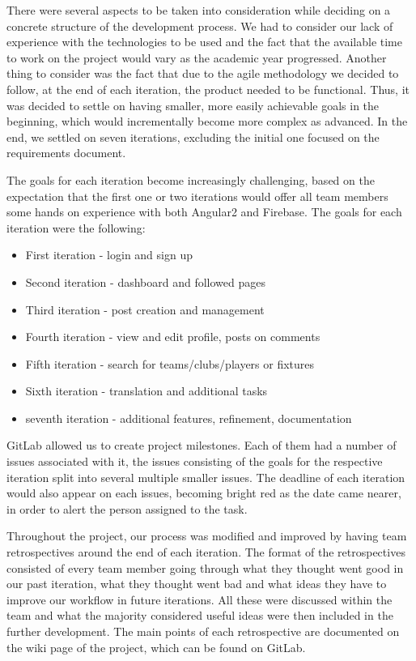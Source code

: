 \documentclass{l3proj}
\begin{document}
There were several aspects to be taken into consideration while deciding
 on a concrete structure of the development process. We had to consider
 our lack of experience with the technologies to be used and the fact
 that the available time to work on the project would vary as the academic
 year progressed. Another thing to consider was the fact that due to the
 agile methodology we decided to follow, at the end of each iteration, the
 product needed to be functional. Thus, it was decided to settle on having
 smaller, more easily achievable goals in the beginning, which would
 incrementally become more complex as advanced. In the end, we settled
 on seven iterations, excluding the initial one focused on the requirements
 document.

The goals for each iteration become increasingly challenging, based on the
 expectation that the first one or two iterations would offer all team
 members some hands on experience with both Angular2 and Firebase. The
 goals for each iteration were the following: 
\begin{itemize}
\item First iteration - login and sign up
\item Second iteration - dashboard and followed pages
\item Third iteration - post creation and management
\item Fourth iteration - view and edit profile, posts on comments
\item Fifth iteration - search for teams/clubs/players or fixtures
\item Sixth iteration - translation and additional tasks
\item seventh iteration - additional features, refinement, documentation
\end{itemize} 



GitLab allowed us to create project milestones. Each of them had a number
 of issues associated with it, the issues consisting of the goals for the
 respective iteration split into several multiple smaller issues. The deadline
 of each iteration would also appear on each issues, becoming bright red as the
 date came nearer, in order to alert the person assigned to the task.

Throughout the project, our process was modified and improved by having team
 retrospectives around the end of each iteration. The format of the retrospectives
 consisted of every team member going through what they thought went good in
 our past iteration, what they thought went bad and what ideas they have to
 improve our workflow in future iterations. All these were discussed within
 the team and what the majority considered useful ideas were then included
 in the further development. The main points of each retrospective are
 documented on the wiki page of the project, which can be found on GitLab.
\end{document}
